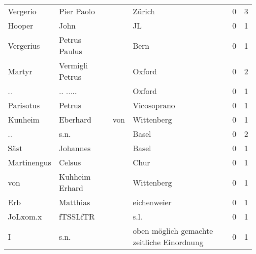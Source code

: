 \begin{center}
\begin{tiny}
\begin{longtabu}{llllrr}
                 Vergerio &                         Pier Paolo &             &                                      Zürich &          0 &         3 \\
                   Hooper &                               John &             &                                          JL &          0 &         1 \\
                Vergerius &                      Petrus Paulus &             &                                        Bern &          0 &         1 \\
                   Martyr &                    Vermigli Petrus &             &                                      Oxford &          0 &         2 \\
                       .. &                           .. ..... &             &                                      Oxford &          0 &         1 \\
                Parisotus &                             Petrus &             &                                 Vicosoprano &          0 &         1 \\
                  Kunheim &                           Eberhard &         von &                                  Wittenberg &          0 &         1 \\
                       .. &                               s.n. &             &                                       Basel &          0 &         2 \\
                     Säst &                           Johannes &             &                                       Basel &          0 &         1 \\
              Martinengus &                             Celsus &             &                                        Chur &          0 &         1 \\
                      von &                     Kuhheim Erhard &             &                                  Wittenberg &          0 &         1 \\
                      Erb &                           Matthias &             &                                 eichenweier &          0 &         1 \\
                 JoLxom.x &                           fTSSLfTR &             &                                        s.l. &          0 &         1 \\
                        I &                               s.n. &             &  oben möglich gemachte zeitliche Einordnung &          0 &         1 \\

\end{longtabu}
\end{tiny}
\end{center}
